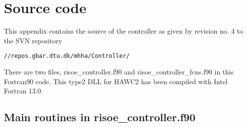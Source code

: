 \appendix
\chapter{Source code} \label{cha:source}

This appendix contains the source of the controller as given by revision no. 4 to the SVN repository 
\begin{verbatim}//repos.gbar.dtu.dk/mhha/Controller/\end{verbatim}
There are two files, risoe\_controller.f90 and risoe\_controller\_fcns.f90 in this Fortran90 code. This type2 DLL for HAWC2 has been compiled with Intel Fortran 13.0.

\section{Main routines in risoe\_controller.f90}
